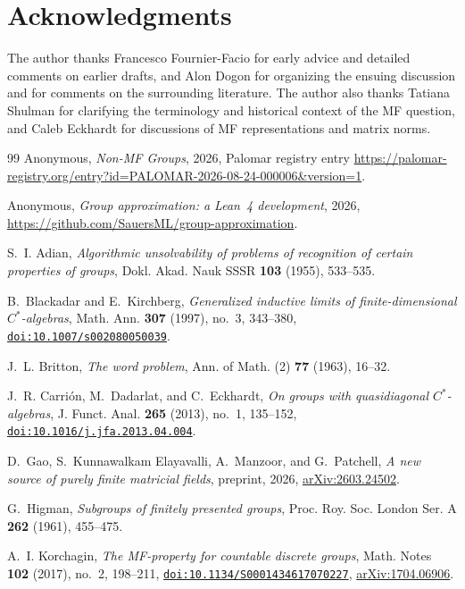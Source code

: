 \documentclass[11pt]{amsart}
\newcommand{\paperauthor}{Anonymous}
\newcommand{\paperauthor}{\paperauthorname}
\newcommand{\doi}[1]{\href{https://doi.org/#1}{\nolinkurl{doi:#1}}}
\theoremstyle{remark}
\theoremstyle{plain}
\begin{document}
\section*{Acknowledgments}

The author thanks Francesco Fournier-Facio for early advice and detailed
comments on earlier drafts, and Alon Dogon for organizing the ensuing
discussion and for comments on the surrounding literature.  The author also
thanks Tatiana Shulman for clarifying the terminology and historical context
of the MF question, and Caleb Eckhardt for discussions of MF representations
and matrix norms.

\begin{thebibliography}{99}
\paperauthor,
\emph{Non-MF Groups},
2026, Palomar registry entry
\url{https://palomar-registry.org/entry?id=PALOMAR-2026-08-24-000006&version=1}.

\paperauthor,
\emph{Group approximation: a Lean~4 development},
2026,
\url{https://github.com/SauersML/group-approximation}.

S.~I. Adian,
\emph{Algorithmic unsolvability of problems of recognition of certain properties of groups},
Dokl. Akad. Nauk SSSR \textbf{103} (1955), 533--535.

B.~Blackadar and E.~Kirchberg,
\emph{Generalized inductive limits of finite-dimensional $C^*$-algebras},
Math. Ann. \textbf{307} (1997), no.~3, 343--380,
\doi{10.1007/s002080050039}.

J.~L. Britton,
\emph{The word problem},
Ann. of Math. (2) \textbf{77} (1963), 16--32.

J.~R. Carri\'on, M.~Dadarlat, and C.~Eckhardt,
\emph{On groups with quasidiagonal $C^*$-algebras},
J. Funct. Anal. \textbf{265} (2013), no.~1, 135--152,
\doi{10.1016/j.jfa.2013.04.004}.

D.~Gao, S.~Kunnawalkam Elayavalli, A.~Manzoor, and G.~Patchell,
\emph{A new source of purely finite matricial fields},
preprint, 2026,
\href{https://arxiv.org/abs/2603.24502}{arXiv:2603.24502}.

G.~Higman,
\emph{Subgroups of finitely presented groups},
Proc. Roy. Soc. London Ser. A \textbf{262} (1961), 455--475.

A.~I. Korchagin,
\emph{The MF-property for countable discrete groups},
Math. Notes \textbf{102} (2017), no.~2, 198--211,
\doi{10.1134/S0001434617070227},
\href{https://arxiv.org/abs/1704.06906}{arXiv:1704.06906}.


\end{thebibliography}
\end{document}
